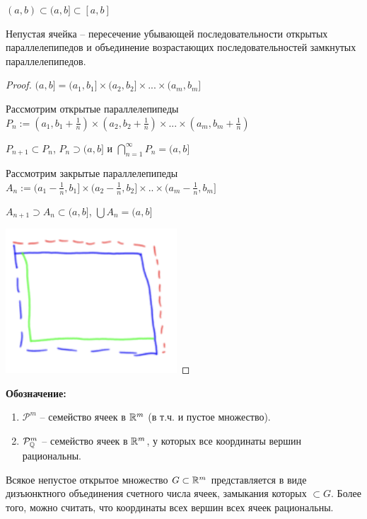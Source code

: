 \begin{remark}
    $(a, b)\subset (a, b]\subset [a, b]$
\end{remark}

\begin{statement}
    Непустая ячейка – пересечение убывающей последовательности открытых параллелепипедов
    и объединение возрастающих последовательностей замкнутых параллелепипедов.
\end{statement}

\begin{proof}
    $(a, b] = (a_1, b_1] \times (a_2, b_2] \times ... \times (a_m, b_m]$

    Рассмотрим открытые параллелепипеды $P_n:=(a_1, b_1 +\frac{1}{n})\times (a_2, b_2 +\frac{1}{n})\times ...\times (a_m, b_m +\frac{1}{n})$

    $P_{n+1}\subset P_n$, $P_n\supset (a, b]$ и $\bigcap\limits_{n=1}^\infty P_n=(a, b]$

    Рассмотрим закрытые параллелепипеды $A_n := (a_1 - \frac{1}{n}, b_1] \times (a_2 - \frac{1}{n}, b_2] \times .. \times (a_m - \frac{1}{n}, b_m]$

    $A_{n+1} \supset A_n \subset (a, b]$, $\bigcup A_n = (a, b]$

    \includegraphics[width=0.18\linewidth]{images/23-09-07-7.png}
\end{proof}

\textbf{Обозначение:} 
\begin{enumerate}
    \item $\mathcal{P}^m$ – семейство ячеек в $\mathbb{R}^m$ (в т.ч. и пустое множество).
    \item $\mathcal{P}_{\mathbb{Q}}^m$ – семейство ячеек в $\mathbb{R}^m$, у которых все координаты вершин рациональны.
\end{enumerate}

\begin{theorem}
    Всякое непустое открытое множество $G \subset \mathbb{R}^m$ представляется в виде дизъюнктного объединения
    счетного числа ячеек, замыкания которых $\subset G$. Более того, можно считать, что координаты всех 
    вершин всех ячеек рациональны.
\end{theorem}

